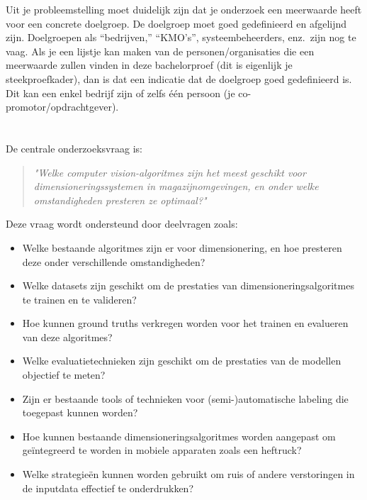 Uit je probleemstelling moet duidelijk zijn dat je onderzoek een meerwaarde heeft voor een concrete doelgroep. De doelgroep moet goed gedefinieerd en afgelijnd zijn. Doelgroepen als ``bedrijven,'' ``KMO's'', systeembeheerders, enz.~zijn nog te vaag. Als je een lijstje kan maken van de personen/organisaties die een meerwaarde zullen vinden in deze bachelorproef (dit is eigenlijk je steekproefkader), dan is dat een indicatie dat de doelgroep goed gedefinieerd is. Dit kan een enkel bedrijf zijn of zelfs één persoon (je co-promotor/opdrachtgever).

\section{}%
\label{sec:onderzoeksvraag}
De centrale onderzoeksvraag is:
\begin{quote}
    \emph{"Welke computer vision-algoritmes zijn het meest
    geschikt voor dimensioneringssystemen in
    magazijnomgevingen, en onder welke omstandigheden
    presteren ze optimaal?"}
\end{quote}

Deze vraag wordt ondersteund door deelvragen zoals:
\begin{itemize}
    \item Welke bestaande algoritmes zijn er voor dimensionering, en hoe presteren deze onder verschillende omstandigheden?
    \item Welke datasets zijn geschikt om de prestaties van dimensioneringsalgoritmes te trainen en te valideren?
    \item Hoe kunnen ground truths verkregen worden voor het trainen en evalueren van deze algoritmes?
    \item Welke evaluatietechnieken zijn geschikt om de prestaties van de modellen objectief te meten?
    \item Zijn er bestaande tools of technieken voor (semi-)automatische labeling die toegepast kunnen worden?
    \item Hoe kunnen bestaande dimensioneringsalgoritmes worden aangepast om geïntegreerd te worden in mobiele apparaten zoals een heftruck?
    \item Welke strategieën kunnen worden gebruikt om ruis of andere verstoringen in de inputdata effectief te onderdrukken?

\end{itemize}

\section{}%
\label{sec:onderzoeksdoelstelling}

